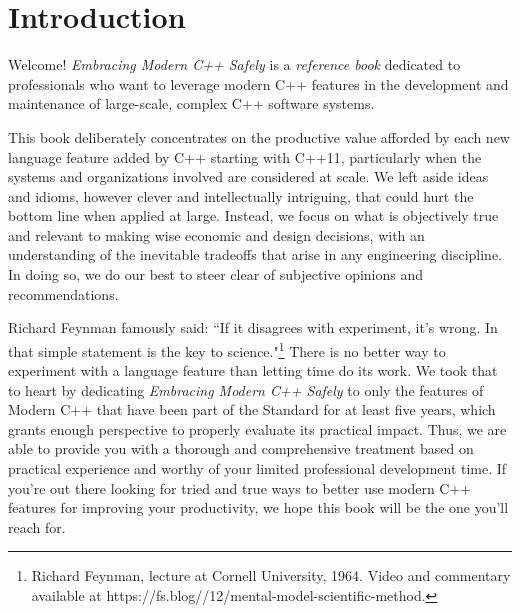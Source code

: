 \setcounter{chapter}{-1}
\chapter[Introduction]{Introduction}\label{ch-intro}
\emcppschapterstart{}

Welcome! \textit{Embracing Modern C++ Safely} is a \textit{reference book} dedicated to professionals who want to leverage modern C++ features in the development and maintenance of large-scale, complex C++ software systems.

This book deliberately concentrates on the productive value afforded by each new language feature added by C++ starting with C++11, particularly when the systems and organizations involved are considered at scale. We left aside ideas and idioms, however clever and intellectually intriguing, that could hurt the bottom line when applied at large. Instead, we focus on what is objectively true and relevant to making wise economic and design decisions, with an understanding of the inevitable tradeoffs that arise in any engineering discipline. In doing so, we do our best to steer clear of subjective opinions and recommendations.

Richard Feynman famously said: ``If it disagrees with experiment, it’s wrong. In that simple statement is the key to science."\footnote{Richard Feynman, lecture at Cornell University, 1964. Video and commentary available at https://\linebreak[3]fs.\linebreak[3]blog//12/mental-model-scientific-method.} There is no better way to experiment with a language feature than letting time do its work. We took that to heart by dedicating \textit{Embracing Modern C++ Safely} to only the features of Modern C++ that have been part of the Standard for at least five years, which grants enough perspective to properly evaluate its practical impact. Thus, we are able to provide you with a thorough and comprehensive treatment based on practical experience and worthy of your limited professional development time. If you're out there looking for tried and true ways to better use modern C++ features for improving your productivity, we hope this book will be the one you'll reach for.

